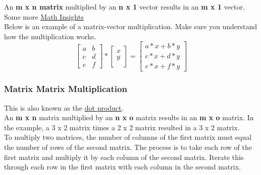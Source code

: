 An \textbf{m x n matrix} multiplied by an \textbf{n x 1} vector results in an \textbf{m x 1} vector.\\

Some more \underline{\href{https://mathinsight.org/matrix_vector_multiplication}{Math Insights}} \\

Below is an example of a matrix-vector multiplication. Make sure you understand how the multiplication works. \\

\begin{equation}
  \left[
    \begin{matrix}
      a & b \\
      c & d \\
      e & f 
    \end{matrix}
    \right] *
  \left[
    \begin{matrix}
      x\\
      y\\
    \end{matrix}
    \right]=
  \left[
    \begin{matrix}
      a*x + b*y \\
      c*x + d*y\\
      e*x + f*y
    \end{matrix}
    \right]
  \label{eqn:MatrixVectorMultiplication}
\end{equation}


\subsubsection{Matrix Matrix Multiplication}

This is also known as the \underline{\href{https://www.mathsisfun.com/algebra/vectors-dot-product.html}{dot product}}.\\

An \textbf{m x n} matrix multiplied by an \textbf{n x o} matrix results in an \textbf{m x o} matrix. In the example, a 3 x 2 matrix times a 2 x 2 matrix resulted in a 3 x 2 matrix.\\

To multiply two matrices, the number of columns of the first matrix must equal the number of rows of the second matrix.  The process is to take each row of the first matrix and multiply it by each column of the second matrix.  Iterate this through each row in the first matrix with each column in the second matrix.  \\


